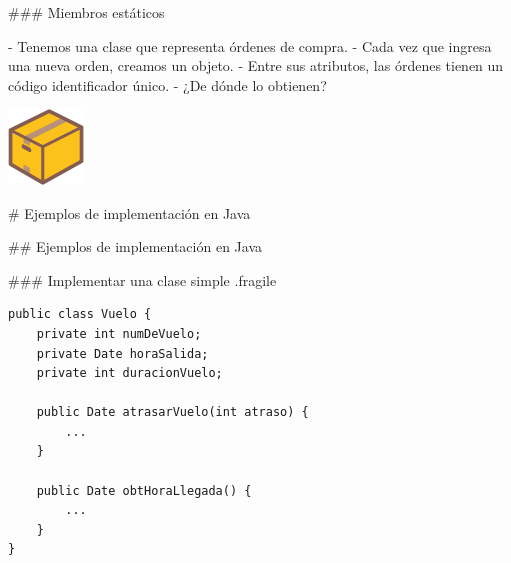 ### Miembros estáticos


\columnsbegin
{}

- Tenemos una clase que representa órdenes de compra.
    - Cada vez que ingresa una nueva orden, creamos un objeto.
    - Entre sus atributos, las órdenes tienen un código identificador único.
        - ¿De dónde lo obtienen?


\centering\includegraphics[width=20mm]{icons/546-emoji_android_package.png}

\pause

\vspace{3em}


\columnsend

# Ejemplos de implementación en Java

## Ejemplos de implementación en Java

### Implementar una clase simple {.fragile}

\columnsbegin




\vspace{-1em}
\begin{lstlisting}
public class Vuelo {
    private int numDeVuelo;
    private Date horaSalida;
    private int duracionVuelo;

    public Date atrasarVuelo(int atraso) {
        ...
    }

    public Date obtHoraLlegada() {
        ...
    }
}
\end{lstlisting}

